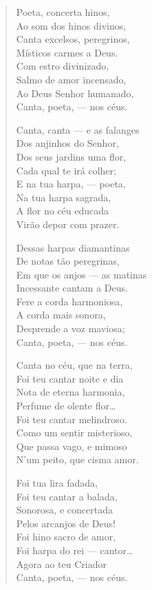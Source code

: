 \begin{verse}
Poeta, concerta hinos,\\
Ao som dos hinos divinos,\\
Canta excelsos, peregrinos,\\
Místicos carmes a Deus.\\
Com estro divinizado,\\
Salmo de amor incensado,\\
Ao Deus Senhor humanado,\\
Canta, poeta, --- nos céus.

Canta, canta --- e as falanges\\
Dos anjinhos do Senhor,\\
Dos seus jardins uma flor,\\
Cada qual te irá colher;\\
E na tua harpa, --- poeta,\\
Na tua harpa sagrada,\\
A flor no céu educada\\
Virão depor com prazer.

\pagebreak

Dessas harpas diamantinas\\
De notas tão peregrinas,\\
Em que os anjos --- as matinas\\
Incessante cantam a Deus.\\
Fere a corda harmoniosa,\\
A corda mais sonora,\\
Desprende a voz maviosa;\\
Canta, poeta, --- nos céus.

Canta no céu, que na terra,\\
Foi teu cantar noite e dia\\
Nota de eterna harmonia,\\
Perfume de olente flor\ldots{}\\
Foi teu cantar melindroso.\\
Como um sentir misterioso,\\
Que passa vago, e mimoso\\
N'um peito, que cisma amor.

Foi tua lira fadada,\\
Foi teu cantar a balada,\\
Sonorosa, e concertada\\
Pelos arcanjos de Deus!\\
Foi hino sacro de amor,\\
Foi harpa do rei --- cantor\ldots{}\\
Agora ao teu Criador\\
Canta, poeta, --- nos céus.
\end{verse}

